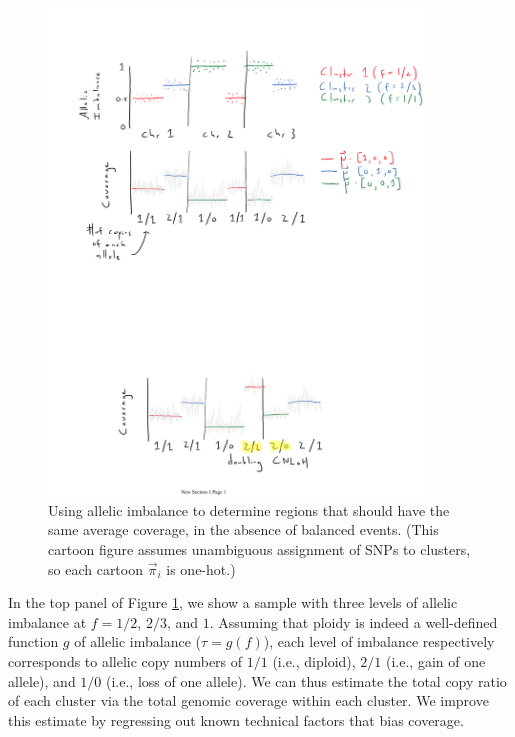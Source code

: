 \documentclass[10pt,letter]{article}
\numberwithin{equation}{section}
\begin{document}
\begin{figure}
\centering
\includegraphics[trim={1cm 13cm 0 3cm},clip,width=10cm]{Figs/fig2.pdf}
\caption{Using allelic imbalance to determine regions that should have the same average coverage, in the absence of balanced events. (This cartoon figure assumes unambiguous assignment of SNPs to clusters, so each cartoon $\vec\pi_i$ is one-hot.)}
\label{NormFig}
\end{figure}

In the top panel of Figure \ref{NormFig}, we show a sample with three levels of allelic imbalance at $f=1/2$, $2/3$, and $1$. Assuming that ploidy is indeed a well-defined function $g$ of allelic imbalance ($\tau = g(f)$), each level of imbalance respectively corresponds to allelic copy numbers of $1/1$ (i.e., diploid), $2/1$ (i.e., gain of one allele), and $1/0$ (i.e., loss of one allele). We can thus estimate the total copy ratio of each cluster via the total genomic coverage within each cluster. We improve this estimate by regressing out known technical factors that bias coverage.
\end{document}
